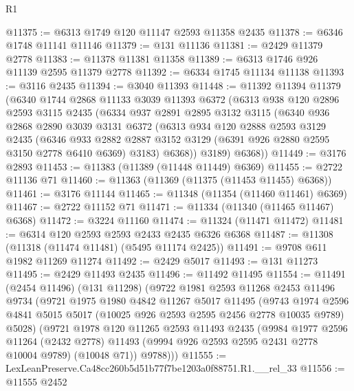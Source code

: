 \begin{lexlean}{R1}
\begin{coremodule}
@11375 := @6313 @1749 @120 @11147 @2593 @11358 @2435
@11378 := @6346 @1748 @11141 @11146
@11379 := @131 @11136
@11381 := @2429 @11379 @2778
@11383 := @11378 @11381 @11358
@11389 := @6313 @1746 @926 @11139 @2595 @11379 @2778
@11392 := @6334 @1745 @11134 @11138
@11393 := @3116 @2435
@11394 := @3040 @11393
@11448 := @11392
    @11394
    @11379
    (@6340
      @1744
      @2868
      @11133
      @3039
      @11393
      @6372
      (@6313
        @938
        @120
        @2896
        @2593
        @3115
        @2435
        (@6334
          @937
          @2891
          @2895
          @3132
          @3115
          (@6340
            @936
            @2868
            @2890
            @3039
            @3131
            @6372
            (@6313
              @934
              @120
              @2888
              @2593
              @3129
              @2435
              (@6346
                @933
                @2882
                @2887
                @3152
                @3129
                (@6391 @926 @2880 @2595 @3150 @2778 @6410 @6369)
                @3183)
              @6368))
          @3189)
        @6368))
@11449 := @3176 @2893
@11453 := @11383 (@11389 (@11448 @11449) @6369)
@11455 := @2722 @11136 @71
@11460 := @11363 (@11369 (@11375 (@11453 @11455) @6368))
@11461 := @3176 @11144
@11465 := @11348 (@11354 (@11460 @11461) @6369)
@11467 := @2722 @11152 @71
@11471 := @11334 (@11340 (@11465 @11467) @6368)
@11472 := @3224 @11160
@11474 := @11324 (@11471 @11472)
@11481 := @6314 @120 @2593 @2593 @2433 @2435 @6326 @6368
@11487 := @11308 (@11318 (@11474 @11481) (@5495 @11174 @2425))
@11491 := @9708 @611 @1982 @11269 @11274
@11492 := @2429 @5017
@11493 := @131 @11273
@11495 := @2429 @11493 @2435
@11496 := @11492 @11495
@11554 := @11491
    (@2454 @11496)
    (@131 @11298)
    (@9722
      @1981
      @2593
      @11268
      @2453
      @11496
      @9734
      (@9721
        @1975
        @1980
        @4842
        @11267
        @5017
        @11495
        (@9743
          @1974
          @2596
          @4841
          @5015
          @5017
          (@10025 @926 @2593 @2595 @2456 @2778 @10035 @9789)
          @5028)
        (@9721
          @1978
          @120
          @11265
          @2593
          @11493
          @2435
          (@9984
            @1977
            @2596
            @11264
            (@2432 @2778)
            @11493
            (@9994 @926 @2593 @2595 @2431 @2778 @10004 @9789)
            (@10048 @71))
          @9788)))
@11555 := LexLeanPreserve.Ca48cc260b5d51b77f7be1203a0f88751.R1.__rel_33
@11556 := @11555 @2452

\end{coremodule}
\end{lexlean}

